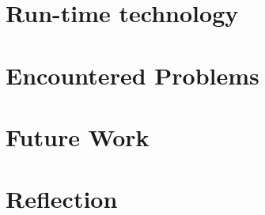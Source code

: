 \documentclass[journal,10pt]{IEEEtran}
\begin{document}
\section{Run-time technology}


\section{Encountered Problems}\label{sec:challenges}


\section{Future Work}


\section{Reflection}



  

\end{document}
